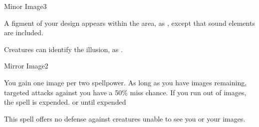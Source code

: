 \begin{spellsection}{Minor Image}{3}
    \begin{spellheader}
    \end{spellheader}
    \begin{spellcontent}
        \begin{spelltargetinginfo}
        \end{spelltargetinginfo}
        \begin{spelleffects}
            \spelleffect A figment of your design appears within the area, as , except that sound elements are included.
            \spelldur \durshort
        \end{spelleffects}
    \end{spellcontent}
    \begin{spellfooter}
        \spellnotes Creatures can identify the illusion, as .
        \miscastexplode
    \end{spellfooter}
\end{spellsection}

\begin{spellsection}{Mirror Image}{2}
    \begin{spellheader}
    \end{spellheader}
    \begin{spellcontent}
        \begin{spelltargetinginfo}
        \end{spelltargetinginfo}
        \begin{spelleffects}
            \spelleffect You gain one image per two spellpower. As long as you have images remaining, targeted attacks against you have a 50\% miss chance. If you run out of images, the spell is expended.
            \spelldur \durshort or until expended \dismissable
        \end{spelleffects}
    \end{spellcontent}
    \begin{spellfooter}
        \spellnotes This spell offers no defense against creatures unable to see you or your images.
        \miscastexplode
    \end{spellfooter}
\end{spellsection}

